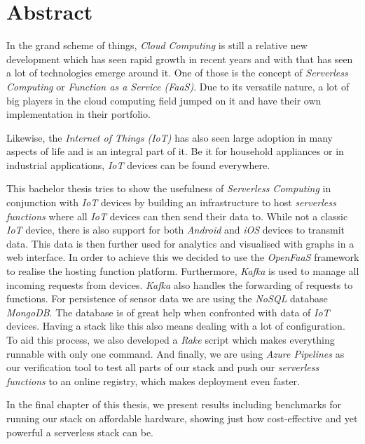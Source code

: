 \chapter*{Abstract}

In the grand scheme of things, \textit{Cloud Computing} is still a relative new development which
has seen rapid growth in recent years and with that has seen a lot of technologies emerge around it.
One of those is the concept of \textit{Serverless Computing} or \textit{Function as a Service
(FaaS)}. Due to its versatile nature, a lot of big players in the cloud computing field jumped on it
and have their own implementation in their portfolio.

Likewise, the \textit{Internet of Things (IoT)} has also seen large adoption in many aspects of life
and is an integral part of it. Be it for household appliances or in industrial applications,
\textit{IoT} devices can be found everywhere.

This bachelor thesis tries to show the usefulness of \textit{Serverless Computing} in conjunction
with \textit{IoT} devices by building an infrastructure to host \textit{serverless functions} where
all \textit{IoT} devices can then send their data to. While not a classic \textit{IoT} device, there
is also support for both \textit{Android} and \textit{iOS} devices to transmit data. This data is
then further used for analytics and visualised with graphs in a web interface. In order to achieve
this we decided to use the \textit{OpenFaaS} framework to realise the hosting function platform.
Furthermore, \textit{Kafka} is used to manage all incoming requests from devices. \textit{Kafka}
also handles the forwarding of requests to functions. For persistence of sensor data we are using
the \textit{NoSQL} database \textit{MongoDB}. The database is of great help when confronted with
data of \textit{IoT} devices. Having a stack like this also means dealing with a lot of
configuration. To aid this process, we also developed a \textit{Rake} script which makes everything
runnable with only one command. And finally, we are using \textit{Azure Pipelines} as our
verification tool to test all parts of our stack and push our \textit{serverless functions} to an
online registry, which makes deployment even faster.

In the final chapter of this thesis, we present results including benchmarks for running our stack
on affordable hardware, showing just how cost-effective and yet powerful a serverless stack can be.
